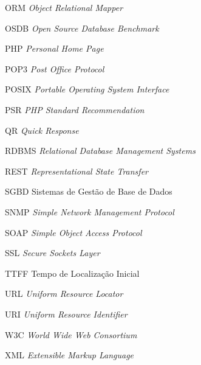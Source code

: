 \begin{siglas}
    \item[ORM] \textit{Object Relational Mapper}
    \item[OSDB] \textit{Open Source Database Benchmark}
    \item[PHP] \textit{Personal Home Page}
    \item[POP3] \textit{Post Office Protocol}
    \item[POSIX] \textit{Portable Operating System Interface}
    \item[PSR] \textit{PHP Standard Recommendation}
    \item[QR] \textit{Quick Response}
    \item[RDBMS] \textit{Relational Database Management Systems}
    \item[REST] \textit{Representational State Transfer}
    \item[SGBD] Sistemas de Gestão de Base de Dados
    \item[SNMP] \textit{Simple Network Management Protocol}
    \item[SOAP] \textit{Simple Object Access Protocol}
    \item[SSL] \textit{Secure Sockets Layer}
    \item[TTFF] Tempo de Localização Inicial
    \item[URL] \textit{Uniform Resource Locator}
    \item[URI] \textit{Uniform Resource Identifier}
    \item[W3C] \textit{World Wide Web Consortium}
    \item[XML] \textit{Extensible Markup Language}
\end{siglas}

